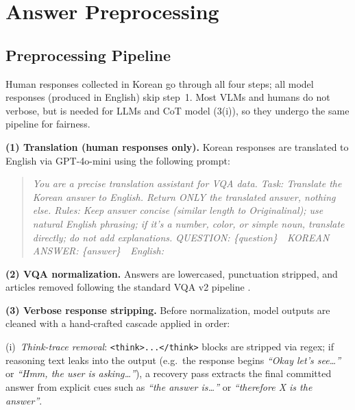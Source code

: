 \documentclass[letterpaper]{article} %
\begin{document}
\clearpage
\section{Answer Preprocessing}
\label{app:preprocessing}

\subsection{Preprocessing Pipeline}
\label{app:preprocessing_pipeline}
Human responses collected in Korean go through all four steps; all model responses (produced in English) skip step~1. Most VLMs and humans do not verbose, but is needed for LLMs and CoT model (3(i)), so they undergo the same pipeline for fairness. %

\textbf{(1) Translation (human responses only).}
Korean responses are translated to English via GPT-4o-mini using the following prompt:
\begin{quote}\small
\textit{You are a precise translation assistant for VQA data.
Task: Translate the Korean answer to English. Return ONLY the translated answer, nothing else.
Rules: Keep answer concise (similar length to Originalinal); use natural English phrasing; if it's a number, color, or simple noun, translate directly; do not add explanations.
QUESTION: \{question\}~~KOREAN ANSWER: \{answer\}~~English:}
\end{quote}

\textbf{(2) VQA normalization.}
Answers are lowercased, punctuation stripped, and articles removed following the standard VQA v2 pipeline \citep{antol2015vqa}.

\textbf{(3) Verbose response stripping.}
Before normalization, model outputs are cleaned with a hand-crafted cascade applied in order:

(i)~\textit{Think-trace removal}: \texttt{<think>...</think>} blocks are stripped via regex; if reasoning text leaks into the output (e.g.\ the response begins \textit{``Okay let's see\ldots''} or \textit{``Hmm, the user is asking\ldots''}), a recovery pass extracts the final committed answer from explicit cues such as \textit{``the answer is\ldots''} or \textit{``therefore X is the answer''}.
\end{document}

